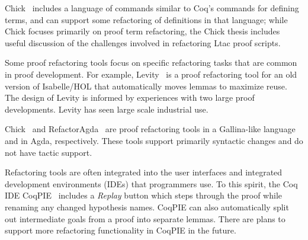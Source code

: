 Chick~\cite{robert2018front} includes a language of commands similar to Coq's commands for defining terms,
and can support some refactoring of definitions in that language;
while Chick focuses primarily on proof term refactoring, the Chick thesis
includes useful discussion of the challenges involved in refactoring Ltac proof scripts.

Some proof refactoring tools focus on specific refactoring tasks that are common in proof development.
For example, Levity~\cite{Bourke12} is a proof refactoring tool for an old version of Isabelle/HOL that automatically
moves lemmas %
to maximize reuse. The design of Levity is informed by
experiences with two large proof developments.
Levity has seen large scale industrial use.

Chick~\cite{robert2018} and RefactorAgda~\cite{wibergh2019} are proof refactoring tools
in a Gallina-like language and in Agda, respectively.
These tools support primarily syntactic changes and do not have tactic support.


Refactoring tools are often integrated into the user interfaces and integrated development environments (IDEs) %
that programmers use. To this spirit, the Coq IDE CoqPIE~\cite{Roe2016} %
includes a \textit{Replay} button which steps through the proof while renaming
any changed hypothesis names. 
CoqPIE can also automatically split out intermediate goals from a proof into separate lemmas. %
There are plans to support more refactoring functionality in CoqPIE in the future. %

